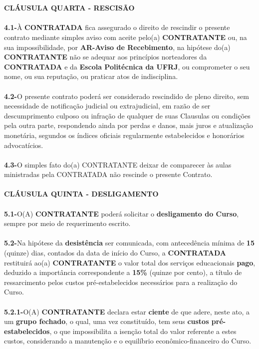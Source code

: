 \documentclass[a4paper,7.5pt]{article}
\begin{document}
\\\\
{\bf CLÁUSULA QUARTA - RESCISÃO}
\\\\
{\bf4.1-}\indent À {\bf CONTRATADA} fica assegurado o direito de rescindir o presente contrato mediante simples aviso com aceite pelo(a) {\bf CONTRATANTE} ou, na sua impossibilidade, por {\bf AR-Aviso de Recebimento}, na hipótese do(a) {\bf CONTRATANTE} não se adequar aos princípios norteadores da {\bf CONTRATADA} e da {\bf Escola Politécnica da UFRJ}, ou comprometer o seu nome, ou sua reputação, ou praticar atos de indisciplina.
\\\\
{\bf4.2-}\indent O presente contrato poderá ser considerado rescindido de pleno direito, sem necessidade de notificação judicial ou extrajudicial, em razão de ser descumprimento culposo ou infração de qualquer de suas Clausulas ou condições pela outra parte, respondendo ainda por perdas e danos, mais juros e atualização monetária, segundos os índices oficiais regularmente estabelecidos e honorários advocatícios.
\\\\
{\bf4.3-}\indent O simples fato do(a) CONTRATANTE deixar de comparecer às aulas ministradas pela CONTRATADA não rescinde o presente Contrato.
\\\\
{\bf CLÁUSULA QUINTA - DESLIGAMENTO}
\\\\
{\bf5.1-}\indent O(A) {\bf CONTRATANTE} poderá solicitar o {\bf desligamento do Curso}, sempre por meio de requerimento escrito.
\\\\
{\bf5.2-}\indent Na hipótese da {\bf desistência} ser comunicada, com antecedência mínima de {\bf15} (quinze) dias, contados da data de início do Curso, a {\bf CONTRATADA} restituirá ao(a) {\bf CONTRATANTE} o valor total dos serviços educacionais {\bf pago}, deduzido a importância correspondente a {\bf15\% }(quinze por cento), a título de ressarcimento pelos custos pré-estabelecidos necessários para a realização do Curso.
\\\\
{\bf5.2.1-}\indent O(A) {\bf CONTRATANTE} declara estar {\bf ciente} de que adere, neste ato, a um {\bf grupo fechado}, o qual, uma vez constituído, tem seus {\bf custos pré-estabelecidos}, o que impossibilita a isenção total do valor referente a estes custos, considerando a manutenção e o equilíbrio econômico-financeiro do Curso.
\end{document}
